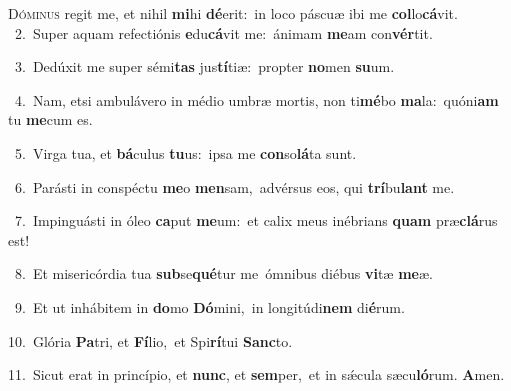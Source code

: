 \lettrine{\initial\textcolor{\initialcolor}{D}}{óminus} regit me, et nihil \textbf{mi}\-hi \textbf{dé}\-erit:~\star in loco páscuæ ibi me \textbf{col}\-lo\-\textbf{cá}\-vit.\\
{\numbfont\textcolor{\numbcolor}{~2.}}~Super aquam refectiónis \textbf{e}\-du\-\textbf{cá}\-vit me:~\star ánimam \textbf{me}\-am con\-\textbf{vér}\-tit.\par
{\numbfont\textcolor{\numbcolor}{~3.}}~Dedúxit me super sémi\textbf{tas} jus\-\textbf{tí}\-tiæ:~\star propter \textbf{no}\-men \textbf{su}\-um.\par
{\numbfont\textcolor{\numbcolor}{~4.}}~Nam, etsi ambulávero in médio umbræ mortis, non ti\-\textbf{mé}\-bo \textbf{ma}\-la:~\star quóni\textbf{am} tu \textbf{me}\-cum es.\par
{\numbfont\textcolor{\numbcolor}{~5.}}~Virga tua, et \textbf{bá}\-culus \textbf{tu}\-us:~\star ipsa me \textbf{con}\-so\-\textbf{lá}\-ta sunt.\par
{\numbfont\textcolor{\numbcolor}{~6.}}~Parásti in conspéctu \textbf{me}\-o \textbf{men}\-sam,~\star advérsus eos, qui \textbf{trí}\-bu\textbf{lant} me.\par
{\numbfont\textcolor{\numbcolor}{~7.}}~Impinguásti in óleo \textbf{ca}\-put \textbf{me}\-um:~\star et calix meus inébrians \textbf{quam} præ\-\textbf{clá}\-rus est!\par
{\numbfont\textcolor{\numbcolor}{~8.}}~Et misericórdia tua \textbf{sub}\-se\-\textbf{qué}\-tur me~\star ómnibus diébus \textbf{vi}\-tæ \textbf{me}\-æ.\par
{\numbfont\textcolor{\numbcolor}{~9.}}~Et ut inhábitem in \textbf{do}\-mo \textbf{Dó}\-mini,~\star in longitúdi\textbf{nem} di\-\textbf{é}\-rum.\par
{\numbfont\textcolor{\numbcolor}{10.}}~Glória \textbf{Pa}\-tri, et \textbf{Fí}\-lio,~\star et Spi\-\textbf{rí}\-tui \textbf{Sanc}\-to.\par
{\numbfont\textcolor{\numbcolor}{11.}}~Sicut erat in princípio, et \textbf{nunc}\-, et \textbf{sem}\-per,~\star et in sǽcula sæcu\-\textbf{ló}\-rum. \textbf{A}\-men.\par
